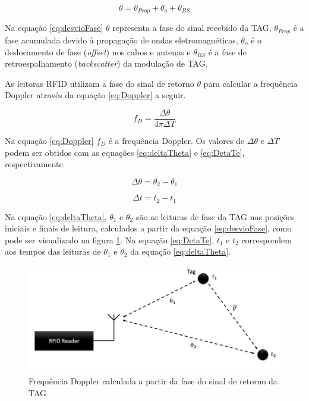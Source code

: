 \begin{equation}
    \theta = \theta_{Prop} + \theta_{o} + \theta_{BS}
    \label{eq:desvioFase}
\end{equation}

Na equação \ref{eq:desvioFase} $\theta$ representa a fase do sinal recebido da TAG, $\theta_{Prop}$ é a fase acumulada devido à propagação de ondas eletromagnéticas, $\theta_{o}$ é o deslocamento de fase (\textit{offset}) nos cabos e antenas e $\theta_{BS}$ é a fase de retroespalhamento (\textit{backscatter}) da modulação de TAG. \cite{nikitin2010phase} \cite{tesch2015rfid}

As leitoras RFID utilizam a fase do sinal de retorno $\theta$ para calcular a frequência Doppler através da equação \ref{eq:Doppler} a seguir.\cite{tesch2015rfid}

\begin{equation}
    f_D = \frac{\Delta \theta}{4 \pi \Delta T}
    \label{eq:Doppler}
\end{equation}

Na equação \ref{eq:Doppler} $f_D$ é a frequência Doppler. Os valores de $\Delta \theta$ e $\Delta T$ podem ser obtidos com as equações \ref{eq:deltaTheta} e \ref{eq:DetaTe}, respectivamente.\cite{tesch2015rfid}

\begin{equation}
    \Delta \theta = \theta_2 - \theta_1
    \label{eq:deltaTheta}
\end{equation}

\begin{equation}
    \Delta t = t_2 - t_1
    \label{eq:DetaTe}
\end{equation}

Na equação \ref{eq:deltaTheta}, $\theta_1$ e $\theta_2$ são as leituras de fase da TAG nas posições iniciais e finais de leitura, calculados a partir da equação \ref{eq:desvioFase}, como pode ser visualizado na figura \ref{fig:dopplerFund}. Na equação \ref{eq:DetaTe}, $t_1$ e $t_2$ correspondem aos tempos das leituras de $\theta_1$ e $\theta_2$ da equação \ref{eq:deltaTheta}. \cite{tesch2015rfid}

\begin{figure}[H]
    \centering
    \includegraphics[width=0.8\linewidth]{figs/Fundamentos/doppler.PNG}
    \caption{Frequência Doppler calculada a partir da fase do sinal de retorno da TAG \cite{tesch2015rfid}}
    \label{fig:dopplerFund}
\end{figure}

